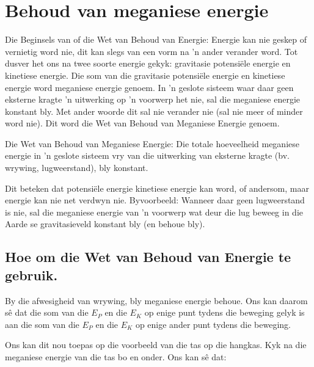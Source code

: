 \section{Behoud van meganiese energie }
            \nopagebreak
{}

 { Die Beginsels van of die Wet van Behoud van Energie: Energie kan nie geskep of vernietig word nie, dit kan slegs van een vorm na  'n ander verander word.  } 
        \label{m38786*id68483}Tot dusver het ons na twee soorte energie gekyk: gravitasie potensiële energie en kinetiese energie. Die som van die gravitasie potensiële energie en kinetiese energie word meganiese energie genoem. In  'n geslote sisteem waar daar geen eksterne kragte 'n uitwerking op  'n voorwerp het nie, sal die meganiese energie konstant bly. Met ander woorde dit sal nie verander nie (sal nie meer of minder word nie). Dit word die Wet van Behoud van Meganiese Energie genoem. 

 { Die Wet van Behoud van Meganiese Energie:  Die totale hoeveelheid meganiese energie in  'n geslote sisteem vry van die uitwerking van eksterne kragte (bv. wrywing, lugweerstand), bly konstant.  } 

Dit beteken dat potensiële energie kinetiese energie kan word, of andersom, maar energie kan nie net verdwyn nie. Byvoorbeeld: Wanneer daar geen lugweerstand is nie, sal die meganiese energie van  'n voorwerp wat deur die lug beweeg in die Aarde se gravitasieveld konstant bly (en behoue bly).




\subsection*{Hoe om die Wet van Behoud van Energie te gebruik.}
            \nopagebreak
        \label{m38786*id68660}By die afwesigheid van wrywing, bly meganiese energie behoue. Ons kan daarom sê dat die som van die ${E}_{P}$ en die ${E}_{K}$ op enige punt tydens die beweging gelyk is aan die som van die ${E}_{P}$ en die ${E}_{K}$ op enige ander punt tydens die beweging.\par 
        \label{m38786*id68713}Ons kan dit nou toepas op die voorbeeld van die tas op die hangkas. Kyk na die meganiese energie van die tas bo en onder. Ons kan s\^{e} dat:\par 

